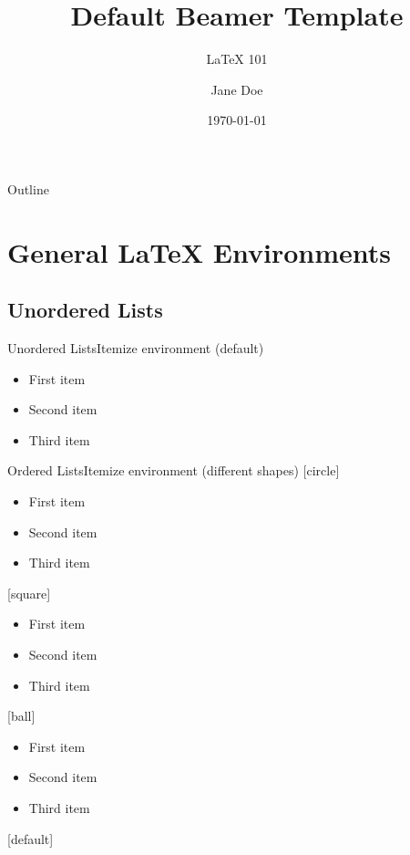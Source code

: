 \documentclass{beamer}
\title {Default Beamer Template}
\subtitle{\LaTeX{} 101}
\author{Jane Doe}
\institute{UC Davis GradPathways}
\date{\today}
\begin{document}
\begin{frame}
	\titlepage
\end{frame}

\label{Outline}
\begin{frame}{Outline}
	\tableofcontents
\end{frame}

\section{General \LaTeX{} Environments}

\subsection{Unordered Lists}

\begin{frame}{Unordered Lists}{Itemize environment (default)}
\begin{itemize}
    \item First item
    \item Second item
    \item Third item
\end{itemize}
\end{frame}

\begin{frame}{Ordered Lists}{Itemize environment (different shapes)}
[circle]
\begin{itemize}
    \item First item
    \item Second item
    \item Third item
\end{itemize}

[square]
\begin{itemize}
    \item First item
    \item Second item
    \item Third item
\end{itemize}

[ball]
\begin{itemize}
    \item First item
    \item Second item
    \item Third item
\end{itemize}

[default] %

\end{frame}
\end{document}
